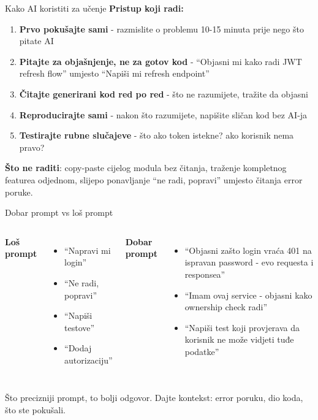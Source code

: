 \begin{frame}{Kako AI koristiti za učenje}
\textbf{Pristup koji radi:}
\begin{enumerate}
  \item \textbf{Prvo pokušajte sami} - razmislite o problemu 10-15 minuta prije nego što pitate AI
  \item \textbf{Pitajte za objašnjenje, ne za gotov kod} - \enquote{Objasni mi kako radi JWT refresh flow} umjesto \enquote{Napiši mi refresh endpoint}
  \item \textbf{Čitajte generirani kod red po red} - što ne razumijete, tražite da objasni
  \item \textbf{Reproducirajte sami} - nakon što razumijete, napišite sličan kod bez AI-ja
  \item \textbf{Testirajte rubne slučajeve} - što ako token istekne? ako korisnik nema pravo?
\end{enumerate}

\vspace{0.4em}
\textbf{Što ne raditi}: copy-paste cijelog modula bez čitanja, traženje kompletnog featurea odjednom, slijepo ponavljanje \enquote{ne radi, popravi} umjesto čitanja error poruke.
\end{frame}

\begin{frame}{Dobar prompt vs loš prompt}
\begin{columns}[T]
\textbf{Loš prompt}
\begin{itemize}
  \item \enquote{Napravi mi login}
  \item \enquote{Ne radi, popravi}
  \item \enquote{Napiši testove}
  \item \enquote{Dodaj autorizaciju}
\end{itemize}

\textbf{Dobar prompt}
\begin{itemize}
  \item \enquote{Objasni zašto login vraća 401 na ispravan password - evo requesta i responsea}
  \item \enquote{Imam ovaj service - objasni kako ownership check radi}
  \item \enquote{Napiši test koji provjerava da korisnik ne može vidjeti tuđe podatke}
\end{itemize}
\end{columns}

\vspace{0.6em}
Što precizniji prompt, to bolji odgovor. Dajte kontekst: error poruku, dio koda, što ste pokušali.
\end{frame}

